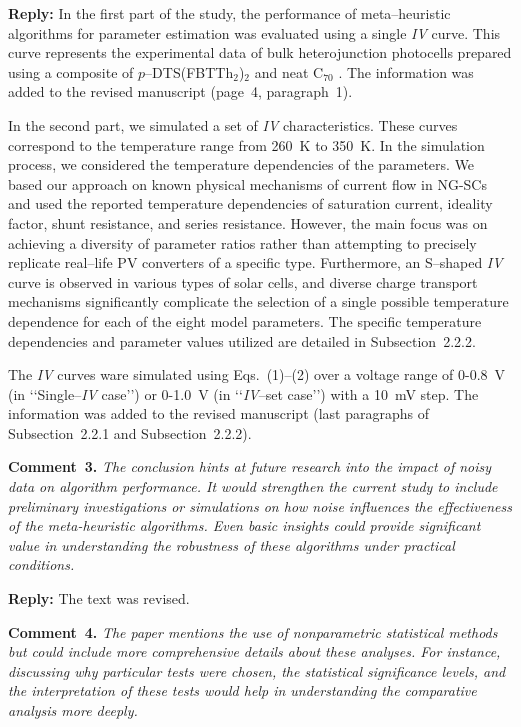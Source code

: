\documentclass[a4paper,fleqn]{cas-sc}
\begin{document}
\noindent
\textcolor[rgb]{0.51,0.00,0.00}{\textbf{Reply:}}
In the first part of the study, the performance of meta--heuristic algorithms for parameter estimation was evaluated using a single \emph{IV} curve.
This curve represents the experimental data of bulk heterojunction photocells prepared
using a composite of $p$--DTS(FBTTh$_2$)$_2$ and neat C$_{70}$ \cite{Tada2015Organic}.
The information was added to the revised manuscript (page~4, paragraph~1).

In the second part, we simulated a set of \emph{IV} characteristics.
These curves correspond to the temperature range from 260~K to 350~K.
In the simulation process, we considered the temperature dependencies of the parameters.
We based our approach on known physical mechanisms of current flow in NG-SCs and
used the reported temperature dependencies of saturation current, ideality factor, shunt resistance, and series resistance.
However, the main focus was on achieving a diversity of parameter ratios rather
than attempting to precisely replicate real--life PV converters of a specific type.
Furthermore, an S--shaped \emph{IV} curve is observed in various types of solar cells,
and diverse charge transport mechanisms significantly complicate the selection of a single possible temperature dependence for each of the eight model parameters.
The specific temperature dependencies and parameter values utilized are detailed in Subsection~2.2.2.

The \emph{IV} curves ware simulated using Eqs.~(1)--(2) over a voltage range of 0-0.8~V (in ‘‘Single--\emph{IV} case’’) or
0-1.0~V (in ‘‘\emph{IV}--set case’’) with a 10~mV step.
The information was added to the revised manuscript (last paragraphs of Subsection~2.2.1 and Subsection~2.2.2).


\vspace{1cm}
\noindent
\textcolor[rgb]{0.00,0.50,1.00}{\textbf{Comment~3.}}
\emph{The conclusion hints at future research into the impact of noisy data on algorithm performance.
It would strengthen the current study to include preliminary investigations or simulations on how noise influences the effectiveness of the meta-heuristic algorithms.
Even basic insights could provide significant value in understanding the robustness of these algorithms under practical conditions.}

\noindent
\textcolor[rgb]{0.51,0.00,0.00}{\textbf{Reply:}}
The text was revised.


\vspace{1cm}
\noindent
\textcolor[rgb]{0.00,0.50,1.00}{\textbf{Comment~4.}}
\emph{The paper mentions the use of nonparametric statistical methods but could include more comprehensive details about these analyses.
For instance, discussing why particular tests were chosen, the statistical significance levels,
 and the interpretation of these tests would help in understanding the comparative analysis more deeply.}
\end{document}
